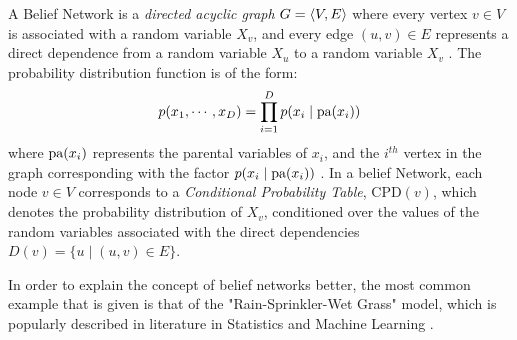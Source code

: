 \begin{frm-def}
\textup{A Belief Network is a \emph{directed acyclic graph} $G = \braket{V,E}$ where every vertex $v \in V$ is associated with a random variable $X_v$, and every edge $(u,v) \in E$ represents a direct dependence from a random variable $X_u$ to a random variable $X_v$ \cite{Gordon-2014}. The probability distribution function is of the form\cite{barberBRML2011}:}
\vspace{-3mm}
\begin{gather*}
p(x_1, \cdots, x_D) = \prod_{i=1}^{D} p(x_i \mid \textup{pa} (x_i))
\end{gather*}
\textup{where $\textup{pa}(x_i)$ represents the parental variables of $x_i$, and the $i^{th}$ vertex in the graph corresponding with the factor $p(x_i \mid \textup{pa} (x_i))$ \footnotemark. In a belief Network, each node $v \in V$ corresponds to a \emph{Conditional Probability Table}, \textsf{CPD}$(v)$, which denotes the probability distribution of $X_v$, conditioned over the values of the random variables associated with the direct dependencies $D(v) = \{u \mid (u,v) \in E\}$.}

\end{frm-def}


\vspace{-3mm}

In order to explain the concept of belief networks better, the most common example that is given is that of the "Rain-Sprinkler-Wet Grass" model, which is popularly described in literature in Statistics and Machine Learning \cite{sprinkler}.

\vspace{3mm}

